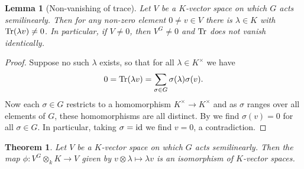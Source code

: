 \documentclass[11pt]{amsart}
\numberwithin{equation}{section}
\newtheorem{theorem}[equation]{Theorem}
\newtheorem{lemma}[equation]{Lemma}
\theoremstyle{remark}
\theoremstyle{remark}
\theoremstyle{remark}
\theoremstyle{definition}
\theoremstyle{definition}
\theoremstyle{definition}
\theoremstyle{definition}
\theoremstyle{definition}
\theoremstyle{definition}
\begin{document}
\begin{lemma}[Non-vanishing of trace] \label{Non-vanishing of trace}
Let $V$ be a $K$-vector space on which $G$ acts semilinearly. Then for any non-zero element $0\neq v\in V$ there is $\lambda\in K$ with $\textup{Tr}(\lambda v)\neq 0$. In particular, if $V\neq 0$, then $V^G\neq 0$ and $\textup{Tr}$ does not vanish identically.  
\end{lemma}

\begin{proof}
Suppose no such $\lambda$ exists, so that for all $\lambda \in K^\times$ we have
\[0=\textup{Tr}(\lambda v)=\sum_{\sigma \in G}\sigma (\lambda)\sigma(v).\]
Now each $\sigma\in G$ restricts to a homomorphism $K^\times \rightarrow K^\times$ and as $\sigma$ ranges over all elements of $G$, these homomorphisms are all distinct. By  we find $\sigma(v)=0$ for all $\sigma \in G$. In particular, taking $\sigma=\textup{id}$ we find $v=0$, a contradiction.
\end{proof}

\begin{theorem} \label{galois descent vector space}
Let $V$ be a $K$-vector space on which $G$ acts semilinearly. Then the map $\phi:V^G\otimes_k K\rightarrow V$ given by $v\otimes \lambda \mapsto \lambda v$ is an isomorphism of $K$-vector spaces. 
\end{theorem}
\end{document}
